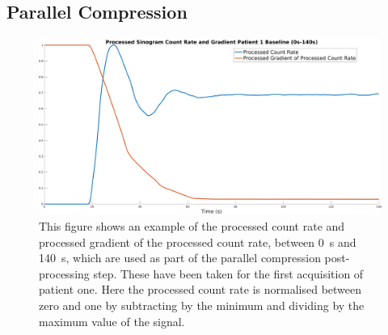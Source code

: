     \subsection*{Parallel Compression} \label{appendix:parallel_compression}
        \begin{figure}
            \centering
            
            \includegraphics[width=1.0\linewidth]{parallel_compression_weighting.png}
            
            \captionsetup{singlelinecheck=false}
            \caption{This figure shows an example of the processed count rate and processed gradient of the processed count rate, between \SI{0}{\second} and \SI{140}{\second}, which are used as part of the parallel compression post-processing step. These have been taken for the first acquisition of patient one. Here the processed count rate is normalised between zero and one by subtracting by the minimum and dividing by the maximum value of the signal.}
            \label{fig:parallel_compression_weighting}
        \end{figure}


